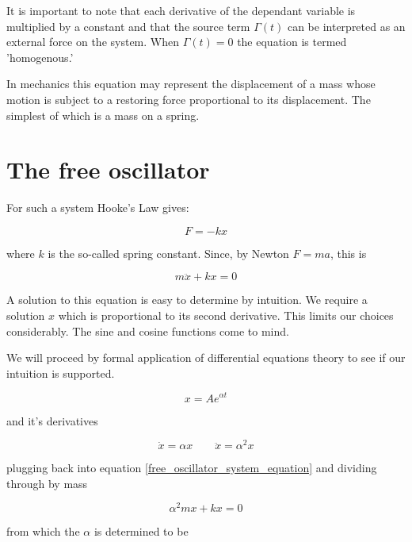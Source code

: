 \documentclass[11pt]{book}
\begin{document}
It is important to note that each derivative of the dependant variable
is multiplied by a constant and that the source term $\Gamma(t)$ can
be interpreted as an external force on the system.  When
$\Gamma(t) = 0$ the equation is termed 'homogenous.'

In mechanics this equation may represent the displacement of a mass
whose motion is subject to a restoring force proportional to its
displacement.  The simplest of which is a mass on a spring.


\section* {The free oscillator}

For such a system Hooke's Law gives:

\begin{equation*}
  F = -kx 
\end{equation*}

where $k$ is the so-called spring constant.  Since, by Newton $F = ma$, this is

\begin{equation}
  \label{free_oscillator_system_equation}
  m \ddot x + kx = 0
\end{equation}

A solution to this equation is easy to determine by intuition.  We
require a solution $x$ which is proportional to its second
derivative.  This limits our choices considerably.  The sine and
cosine functions come to mind.

We will proceed by formal application of differential equations theory
to see if our intuition is supported.

\begin{equation}
  \label{free_oscillator_solution}
  x = Ae^{\alpha t}
\end{equation}

and it's derivatives

\begin{equation}
  \dot x = \alpha x \quad \quad  \ddot x = \alpha ^2 x
\end{equation}

plugging back into equation \eqref{free_oscillator_system_equation}
and dividing through by mass

\begin{equation*}
  \alpha^2 mx + kx = 0
\end{equation*}

from which the $\alpha$ is determined to be
\end{document}
